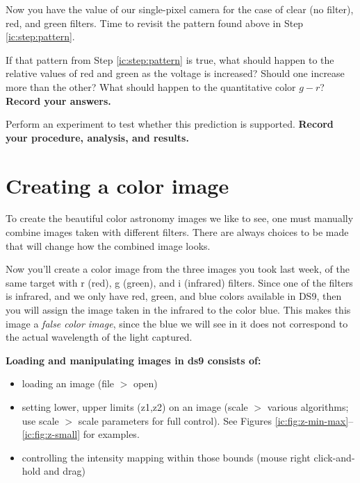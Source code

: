 Now you have the value of our single-pixel camera for the case of clear (no filter), red, and green filters. Time to revisit the pattern found above in Step \ref{ic:step:pattern}.

\begin{steps}
	\item If that pattern from Step \ref{ic:step:pattern} is true, what should happen to the relative values of red and green as the voltage is increased? Should one increase more than the other? What should happen to the quantitative color $g-r$? \textbf{Record your answers.}
	
	\item Perform an experiment to test whether this prediction is supported. \textbf{Record your procedure, analysis, and results.}
\end{steps}

\section{Creating a color image}

To create the beautiful color astronomy images we like to see, one must manually combine images taken with different filters. There are always choices to be made that will change how the combined image looks.

Now you'll create a color image from the three images you took last week, of the same target with r (red), g (green), and i (infrared) filters. Since one of the filters is infrared, and we only have red, green, and blue colors available in DS9, then you will assign the image taken in the infrared to the color blue. This makes this image a \textit{false color image}, since the blue we will see in it does not correspond to the actual wavelength of the light captured.

\textbf{Loading and manipulating images in ds9 consists of:}
\begin{itemize}
\item loading an image  (file $>$ open)
\item setting lower, upper limits (z1,z2) on an image  (scale $>$ various algorithms; use scale $>$ scale parameters for full control). See Figures \ref{ic:fig:z-min-max}--\ref{ic:fig:z-small} for examples.
\item controlling the intensity mapping within those bounds (mouse right click-and-hold and drag)
\end{itemize}

